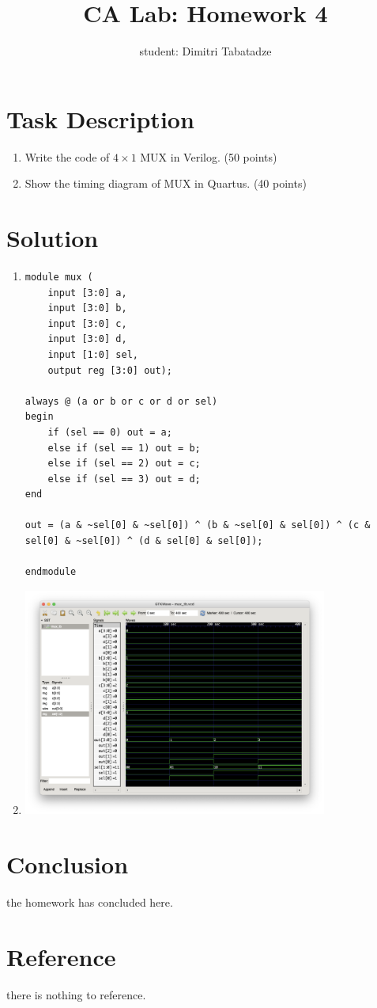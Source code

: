 \documentclass{article}
\title{CA Lab: Homework 4}
\author{student: Dimitri Tabatadze}
\begin{document}
    \maketitle

    \section*{Task Description} 
    
    \begin{enumerate}[label={\alph*}]
        \item {Write the code of $4\times1$ MUX in Verilog. (50 points)}
        \item {Show the timing diagram of MUX in Quartus. (40 points)}
    \end{enumerate}

    \section*{Solution}
    
    \begin{enumerate}[label={\alph*)}]
        \item {
            \begin{lstlisting}
module mux (
    input [3:0] a,
    input [3:0] b,
    input [3:0] c,
    input [3:0] d,
    input [1:0] sel,
    output reg [3:0] out);

always @ (a or b or c or d or sel)
begin
    if (sel == 0) out = a;
    else if (sel == 1) out = b;
    else if (sel == 2) out = c;
    else if (sel == 3) out = d;
end

out = (a & ~sel[0] & ~sel[0]) ^ (b & ~sel[0] & sel[0]) ^ (c & sel[0] & ~sel[0]) ^ (d & sel[0] & sel[0]);
    
endmodule
            \end{lstlisting}
        }
        \item {
            \includegraphics[width=10cm]{hw.png}
        }
    \end{enumerate}

    \section*{Conclusion}
    the homework has concluded here.
    \section*{Reference}
    there is nothing to reference.
\end{document}
